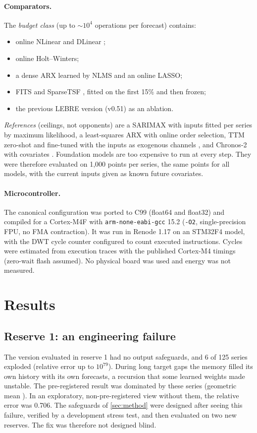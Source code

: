 \documentclass[11pt]{article}
\theoremstyle{remark}
\begin{document}
\paragraph{Comparators.} The \emph{budget class} (up to $\sim10^4$ operations per forecast) contains:
\begin{itemize}
  \item online NLinear and DLinear \citep{zeng2023dlinear};
  \item online Holt--Winters;
  \item a dense ARX learned by NLMS and an online LASSO;
  \item FITS \citep{xu2024fits} and SparseTSF \citep{lin2024sparsetsf}, fitted on the first 15\% and then frozen;
  \item the previous LEBRE version (v0.51) as an ablation.
\end{itemize}
\emph{References} (ceilings, not opponents) are a SARIMAX with inputs fitted per series by maximum likelihood, a least-squares ARX with online order selection, TTM zero-shot and fine-tuned with the inputs as exogenous channels \citep{ekambaram2024ttm}, and Chronos-2 with covariates \citep{ansari2025chronos2}. Foundation models are too expensive to run at every step. They were therefore evaluated on 1{,}000 points per series, the same points for all models, with the current inputs given as known future covariates.

\paragraph{Microcontroller.} The canonical configuration was ported to C99 (float64 and float32) and compiled for a Cortex-M4F with \texttt{arm-none-eabi-gcc} 15.2 (\texttt{-O2}, single-precision FPU, no FMA contraction). It was run in Renode 1.17 \citep{renode} on an STM32F4 model, with the DWT cycle counter configured to count executed instructions. Cycles were estimated from execution traces with the published Cortex-M4 timings (zero-wait flash assumed). No physical board was used and energy was not measured.

\section{Results}\label{sec:results}

\subsection{Reserve 1: an engineering failure}\label{sec:res1}
The version evaluated in reserve 1 had no output safeguards, and 6 of 125 series exploded (relative error up to $10^{79}$). During long target gaps the memory filled its own history with its own forecasts, a recursion that some learned weights made unstable. The pre-registered result was dominated by these series (geometric mean \rOneAll). In an exploratory, non-pre-registered view without them, the relative error was 0.706. The safeguards of \cref{sec:method} were designed after seeing this failure, verified by a development stress test, and then evaluated on two new reserves. The fix was therefore not designed blind.
\end{document}
